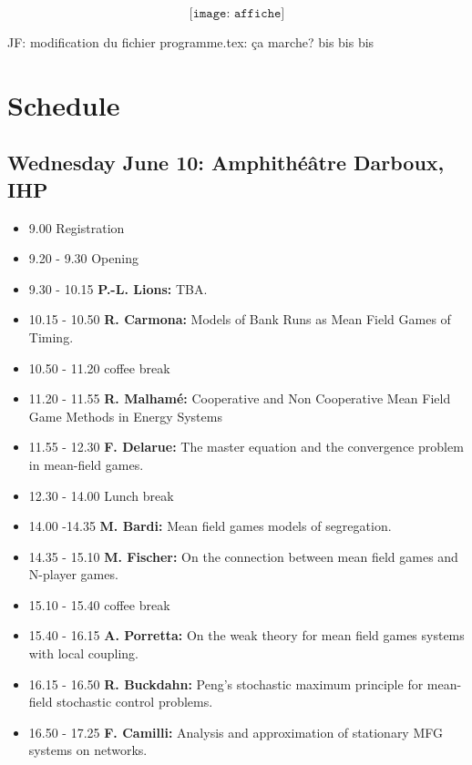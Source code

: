 \documentclass[11pt]{article}
\begin{document}
\[
\texttt{[image: affiche]}
\]
\vfill\eject

JF: modification du fichier programme.tex: ça marche? bis bis bis  


\section*{Schedule}

\subsection*{Wednesday June  10: Amphith{\'e}{\^a}tre Darboux, IHP}
\begin{itemize}
\item 9.00  Registration 
\item 9.20 - 9.30  Opening
\item 9.30 - 10.15  {\bf P.-L. Lions:}  TBA.
\item 10.15 - 10.50  {\bf R. Carmona:}  Models of Bank Runs as Mean Field Games of Timing. 
\item 10.50 - 11.20   coffee break
\item 11.20 - 11.55  {\bf R. Malham{\' e}:}   Cooperative and Non Cooperative Mean Field Game Methods in Energy Systems 
\item 11.55 - 12.30  {\bf F. Delarue:}  The master equation and the convergence problem in mean-field games.
\item 12.30 - 14.00  Lunch break
\item 14.00 -14.35 {\bf  M. Bardi:} Mean field games models of segregation.
\item 14.35 - 15.10 {\bf M. Fischer:} On the connection between mean field games and N-player games. 
\item 15.10 - 15.40  coffee break
\item 15.40 - 16.15  {\bf  A. Porretta:} On the weak theory for mean field games systems with local coupling. 
\item 16.15 - 16.50 {\bf  R. Buckdahn:} Peng's stochastic maximum principle for mean-field stochastic control problems. 
\item 16.50 - 17.25 {\bf  F. Camilli:} Analysis and approximation of   stationary MFG systems  on  networks.
\end{itemize}
\vfill\eject
\end{document}
